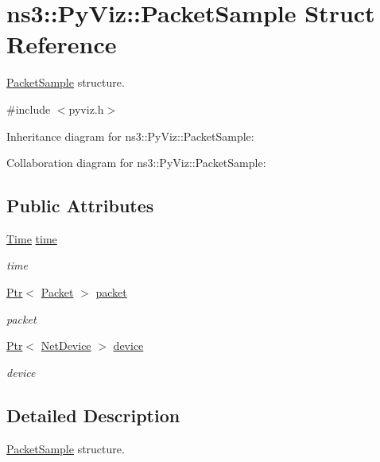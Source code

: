\hypertarget{structns3_1_1PyViz_1_1PacketSample}{}\section{ns3\+:\+:Py\+Viz\+:\+:Packet\+Sample Struct Reference}
\label{structns3_1_1PyViz_1_1PacketSample}


\hyperlink{structns3_1_1PyViz_1_1PacketSample}{Packet\+Sample} structure.  




{\ttfamily \#include $<$pyviz.\+h$>$}



Inheritance diagram for ns3\+:\+:Py\+Viz\+:\+:Packet\+Sample\+:


Collaboration diagram for ns3\+:\+:Py\+Viz\+:\+:Packet\+Sample\+:
\subsection*{Public Attributes}
\begin{DoxyCompactItemize}
\item 
\hyperlink{classns3_1_1Time}{Time} \hyperlink{structns3_1_1PyViz_1_1PacketSample_aae168eab829eba2f06eb327f4e6906fa}{time}
\begin{DoxyCompactList}\small\item\em time \end{DoxyCompactList}\item 
\hyperlink{classns3_1_1Ptr}{Ptr}$<$ \hyperlink{classns3_1_1Packet}{Packet} $>$ \hyperlink{structns3_1_1PyViz_1_1PacketSample_ac22e75ce168860f42f8279cac4a3d676}{packet}
\begin{DoxyCompactList}\small\item\em packet \end{DoxyCompactList}\item 
\hyperlink{classns3_1_1Ptr}{Ptr}$<$ \hyperlink{classns3_1_1NetDevice}{Net\+Device} $>$ \hyperlink{structns3_1_1PyViz_1_1PacketSample_ad9bbbf3e89652d7c351a31dece4bb0b5}{device}
\begin{DoxyCompactList}\small\item\em device \end{DoxyCompactList}\end{DoxyCompactItemize}


\subsection{Detailed Description}
\hyperlink{structns3_1_1PyViz_1_1PacketSample}{Packet\+Sample} structure. 

